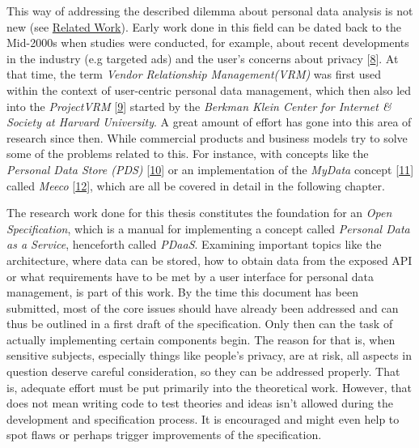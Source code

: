 \documentclass[12pt,english,a4paper,titlepage,cleardoublepage=empty,dottedtoc]{report}
\begin{document}
This way of addressing the described dilemma about personal data
analysis is not new (see \protect\hyperlink{related-work}{Related
Work}). Early work done in this field can be dated back to the Mid-2000s
when studies were conducted, for example, about recent developments in
the industry (e.g targeted ads) and the user's concerns about privacy
{[}\protect\hyperlink{ref-study_2004_architecture-for-privacy-sensitive-ubiquitous-computing}{8}{]}.
At that time, the term \emph{Vendor Relationship Management(VRM)} was
first used within the context of user-centric personal data management,
which then also led into the \emph{ProjectVRM}
{[}\protect\hyperlink{ref-web_2010_projectvrm_about}{9}{]} started by
the \emph{Berkman Klein Center for Internet \& Society at Harvard
University}. A great amount of effort has gone into this area of
research since then. While commercial products and business models try
to solve some of the problems related to this. For instance, with
concepts like the \emph{Personal Data Store (PDS)}
{[}\protect\hyperlink{ref-paper_2013_the-personal-data-store-approach-to-personal-data-security_2013}{10}{]}
or an implementation of the \emph{MyData} concept
{[}\protect\hyperlink{ref-whitepaper_2014_mydata-a-nordic-model-for-human-centered-personal-data-management-and-processing}{11}{]}
called \emph{Meeco}
{[}\protect\hyperlink{ref-web_2016_meeco-how-it-works}{12}{]}, which are
all be covered in detail in the following chapter.

The research work done for this thesis constitutes the foundation for an
\emph{Open Specification}, which is a manual for implementing a concept
called \emph{Personal Data as a Service}, henceforth called
\emph{PDaaS}. Examining important topics like the architecture, where
data can be stored, how to obtain data from the exposed API or what
requirements have to be met by a user interface for personal data
management, is part of this work. By the time this document has been
submitted, most of the core issues should have already been addressed
and can thus be outlined in a first draft of the specification. Only
then can the task of actually implementing certain components begin. The
reason for that is, when sensitive subjects, especially things like
people's privacy, are at risk, all aspects in question deserve careful
consideration, so they can be addressed properly. That is, adequate
effort must be put primarily into the theoretical work. However, that
does not mean writing code to test theories and ideas isn't allowed
during the development and specification process. It is encouraged and
might even help to spot flaws or perhaps trigger improvements of the
specification.
\end{document}
